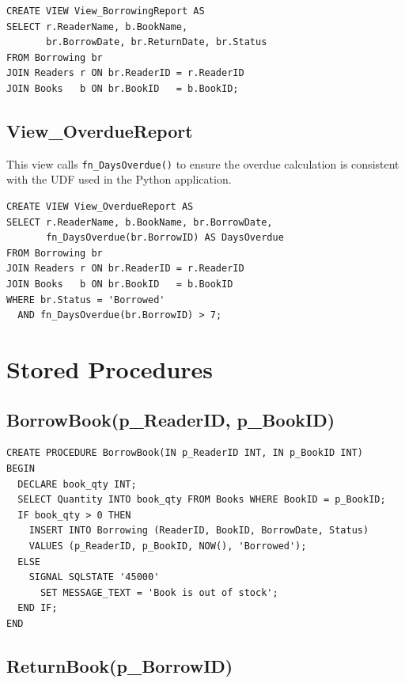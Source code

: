 \documentclass[12pt,a4paper,oneside]{report}
\begin{document}
\begin{lstlisting}[style=sqlstyle, caption={View\_BorrowingReport}]
CREATE VIEW View_BorrowingReport AS
SELECT r.ReaderName, b.BookName,
       br.BorrowDate, br.ReturnDate, br.Status
FROM Borrowing br
JOIN Readers r ON br.ReaderID = r.ReaderID
JOIN Books   b ON br.BookID   = b.BookID;
\end{lstlisting}

\subsection{View\_OverdueReport}

This view calls \texttt{fn\_DaysOverdue()} to ensure the overdue calculation
is consistent with the UDF used in the Python application.

\begin{lstlisting}[style=sqlstyle, caption={View\_OverdueReport}]
CREATE VIEW View_OverdueReport AS
SELECT r.ReaderName, b.BookName, br.BorrowDate,
       fn_DaysOverdue(br.BorrowID) AS DaysOverdue
FROM Borrowing br
JOIN Readers r ON br.ReaderID = r.ReaderID
JOIN Books   b ON br.BookID   = b.BookID
WHERE br.Status = 'Borrowed'
  AND fn_DaysOverdue(br.BorrowID) > 7;
\end{lstlisting}

\section{Stored Procedures}

\subsection{BorrowBook(p\_ReaderID, p\_BookID)}

\begin{lstlisting}[style=sqlstyle, caption={Stored Procedure: BorrowBook}]
CREATE PROCEDURE BorrowBook(IN p_ReaderID INT, IN p_BookID INT)
BEGIN
  DECLARE book_qty INT;
  SELECT Quantity INTO book_qty FROM Books WHERE BookID = p_BookID;
  IF book_qty > 0 THEN
    INSERT INTO Borrowing (ReaderID, BookID, BorrowDate, Status)
    VALUES (p_ReaderID, p_BookID, NOW(), 'Borrowed');
  ELSE
    SIGNAL SQLSTATE '45000'
      SET MESSAGE_TEXT = 'Book is out of stock';
  END IF;
END
\end{lstlisting}

\subsection{ReturnBook(p\_BorrowID)}
\end{document}
